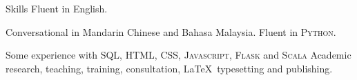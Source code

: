 
\begin{rubric}{Skills}
\entry*[Languages]
	Fluent in English. \par Conversational in Mandarin Chinese and Bahasa Malaysia.
	Fluent in \textsc{Python}. \par Some experience with SQL, 	\textsc{HTML, CSS, Javascript, Flask} and \textsc{Scala}
\entry*[Misc.]
	Academic research, teaching, training, consultation, \LaTeX\ typesetting and publishing.
\end{rubric}
